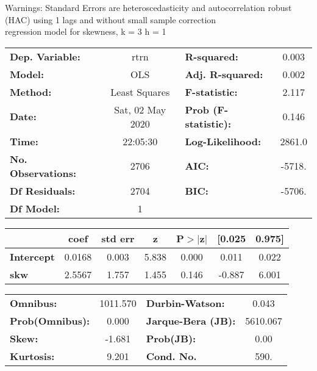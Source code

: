 Warnings: \newline
 [1] Standard Errors are heteroscedasticity and autocorrelation robust (HAC) using 1 lags and without small sample correction\\ 

regression model for skewness, k = 3 h = 1\begin{center}
\begin{tabular}{lclc}
\toprule
\textbf{Dep. Variable:}    &       rtrn       & \textbf{  R-squared:         } &     0.003   \\
\textbf{Model:}            &       OLS        & \textbf{  Adj. R-squared:    } &     0.002   \\
\textbf{Method:}           &  Least Squares   & \textbf{  F-statistic:       } &     2.117   \\
\textbf{Date:}             & Sat, 02 May 2020 & \textbf{  Prob (F-statistic):} &    0.146    \\
\textbf{Time:}             &     22:05:30     & \textbf{  Log-Likelihood:    } &    2861.0   \\
\textbf{No. Observations:} &        2706      & \textbf{  AIC:               } &    -5718.   \\
\textbf{Df Residuals:}     &        2704      & \textbf{  BIC:               } &    -5706.   \\
\textbf{Df Model:}         &           1      & \textbf{                     } &             \\
\bottomrule
\end{tabular}
\begin{tabular}{lcccccc}
                   & \textbf{coef} & \textbf{std err} & \textbf{z} & \textbf{P$> |$z$|$} & \textbf{[0.025} & \textbf{0.975]}  \\
\midrule
\textbf{Intercept} &       0.0168  &        0.003     &     5.838  &         0.000        &        0.011    &        0.022     \\
\textbf{skw}       &       2.5567  &        1.757     &     1.455  &         0.146        &       -0.887    &        6.001     \\
\bottomrule
\end{tabular}
\begin{tabular}{lclc}
\textbf{Omnibus:}       & 1011.570 & \textbf{  Durbin-Watson:     } &    0.043  \\
\textbf{Prob(Omnibus):} &   0.000  & \textbf{  Jarque-Bera (JB):  } & 5610.067  \\
\textbf{Skew:}          &  -1.681  & \textbf{  Prob(JB):          } &     0.00  \\
\textbf{Kurtosis:}      &   9.201  & \textbf{  Cond. No.          } &     590.  \\
\bottomrule
\end{tabular}
\end{center}

